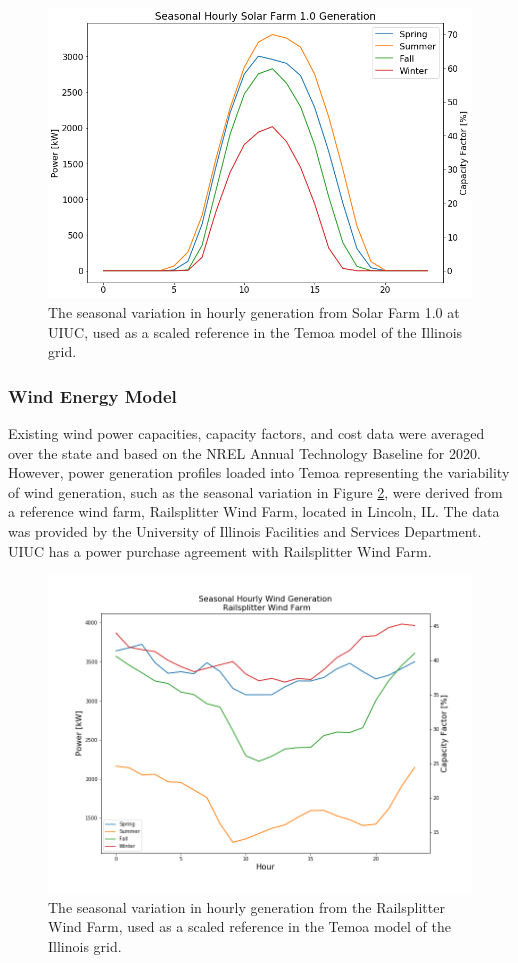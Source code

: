 \begin{figure}[H]
	\centering
	\includegraphics[width=0.7\columnwidth]{./img/seasonal_hourly_solar.png}
	\caption{}
	\caption{The seasonal variation in hourly generation from Solar Farm 
        1.0 at \gls{UIUC}, used as a scaled reference in the Temoa model of the Illinois grid. }
	\label{fig:seasonal_hourly_solar}
\end{figure}

\FloatBarrier

\subsubsection{Wind Energy Model}
Existing wind power capacities, capacity factors, and cost data were averaged over the state and 
based on the \gls{NREL} Annual Technology Baseline for 2020. However, power 
generation profiles loaded into Temoa representing the variability of wind 
generation, such as the seasonal variation in Figure 
\ref{fig:seasonal_hourly_wind}, were derived from a reference wind farm, Railsplitter Wind Farm, 
located in Lincoln, IL. The data was provided by the University of Illinois 
Facilities and Services Department. UIUC has a power purchase agreement with Railsplitter Wind 
Farm.


\begin{figure}[H]
	\centering
	\includegraphics[width=0.7\columnwidth]{./img/cap/seasonal_hourly_wind.png}
	\caption{The seasonal variation in hourly generation from the Railsplitter Wind Farm, used as a scaled reference in the Temoa model of the Illinois grid. }
	\label{fig:seasonal_hourly_wind}
\end{figure}
\FloatBarrier

